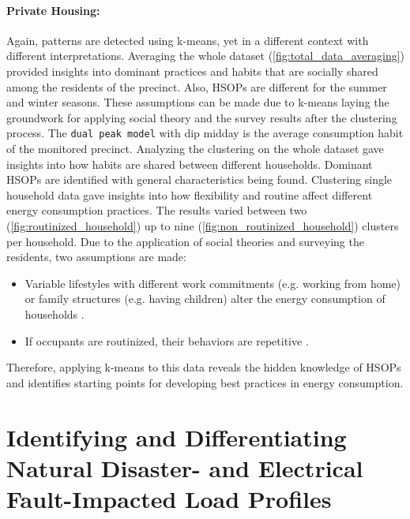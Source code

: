 \paragraph*{Private Housing:}
Again, patterns are detected using k-means, yet in a different context with different interpretations.
Averaging the whole dataset (\autoref{fig:total_data_averaging}) provided insights into dominant practices and habits that are socially shared among the residents of the precinct.
Also, HSOPs are different for the summer and winter seasons.
These assumptions can be made due to k-means laying the groundwork for applying social theory and the survey results after the clustering process.
The \texttt{dual peak model} with dip midday is the average consumption habit of the monitored precinct.
Analyzing the clustering on the whole dataset gave insights into how habits are shared between different households.
Dominant HSOPs are identified with general characteristics being found.
Clustering single household data gave insights into how flexibility and routine affect different energy consumption practices.
The results varied between two (\autoref{fig:routinized_household}) up to nine (\autoref{fig:non_routinized_household}) clusters per household.
Due to the application of social theories and surveying the residents, two assumptions are made:
\begin{itemize}
    \item Variable lifestyles with different work commitments (e.g. working from home) or family structures (e.g. having children) alter the energy consumption of households \cite{KUR-HBP}.
    \item If occupants are routinized, their behaviors are repetitive \cite{BRE-EWP}.
\end{itemize}
Therefore, applying k-means to this data reveals the hidden knowledge of HSOPs and identifies starting points for developing best practices in energy consumption.

\section{Identifying and Differentiating Natural Disaster- and Electrical Fault-Impacted Load Profiles}
\label{sec:identifying_and_differentiating_natural_disaster_and_electrical_fault_impacted_load_profiles}